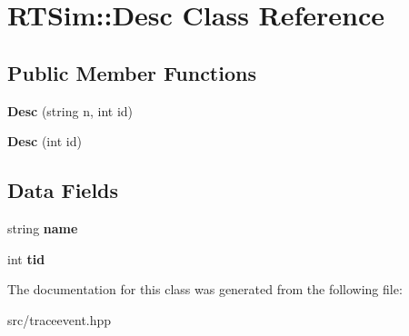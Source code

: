 \hypertarget{classRTSim_1_1Desc}{}\section{R\+T\+Sim\+:\+:Desc Class Reference}
\label{classRTSim_1_1Desc}
\subsection*{Public Member Functions}
\begin{DoxyCompactItemize}
\item 
{\bfseries Desc} (string n, int id)\hypertarget{classRTSim_1_1Desc_a086210c0cda176db2b5d926ecd7afc41}{}\label{classRTSim_1_1Desc_a086210c0cda176db2b5d926ecd7afc41}

\item 
{\bfseries Desc} (int id)\hypertarget{classRTSim_1_1Desc_ad227ac0546592cb4256b43a3efcaf2f2}{}\label{classRTSim_1_1Desc_ad227ac0546592cb4256b43a3efcaf2f2}

\end{DoxyCompactItemize}
\subsection*{Data Fields}
\begin{DoxyCompactItemize}
\item 
string {\bfseries name}\hypertarget{classRTSim_1_1Desc_ab57ac6b6afe095c2184c337d78f8a67e}{}\label{classRTSim_1_1Desc_ab57ac6b6afe095c2184c337d78f8a67e}

\item 
int {\bfseries tid}\hypertarget{classRTSim_1_1Desc_a72e3d3be7943415d0c122c60d7aba64d}{}\label{classRTSim_1_1Desc_a72e3d3be7943415d0c122c60d7aba64d}

\end{DoxyCompactItemize}


The documentation for this class was generated from the following file\+:\begin{DoxyCompactItemize}
\item 
src/traceevent.\+hpp\end{DoxyCompactItemize}
